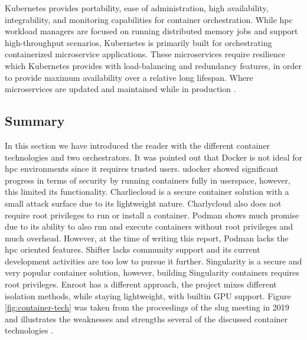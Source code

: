 \documentclass[conference]{IEEEtran}
\begin{document}
Kubernetes provides portability, ease of administration, high availability, integrability, and monitoring capabilities for container orchestration. While \gls{hpc} workload managers are focused on running distributed memory jobs and support high-throughput scenarios, Kubernetes is primarily built for orchestrating containerized microservice applications. These microservices require resilience which Kubernetes provides with load-balancing and redundancy features, in order to provide maximum availability over a relative long lifespan. Where microservices are updated and maintained while in production \cite{hpc-kubernetes-containers}.


\subsection{Summary}
In this section we have introduced the reader with the different container technologies and two orchestrators. It was pointed out that Docker is not ideal for \gls{hpc} environments since it requires trusted users. udocker showed significant progress in terms of security by running containers fully in userspace, however, this limited its functionality. Charliecloud is a secure container solution with a small attack surface due to its lightweight nature. Charlycloud also does not require root privileges to run or install a container. Podman shows much promise due to its ability to also run and execute containers without root privileges and much overhead. However, at the time of writing this report, Podman lacks the \gls{hpc} oriented features. Shifter lacks community support and its current development activities are too low to pursue it further. Singularity is a secure and very popular container solution, however, building Singularity containers requires root privileges. Enroot has a different approach, the project mixes different isolation methods, while staying lightweight, with builtin GPU support. Figure \ref{fig:container-tech} was taken from the proceedings of the \gls{slug} meeting in 2019 and illustrates the weaknesses and strengths several of the discussed container technologies \cite{nvidia-slurm-containers}.
\end{document}
